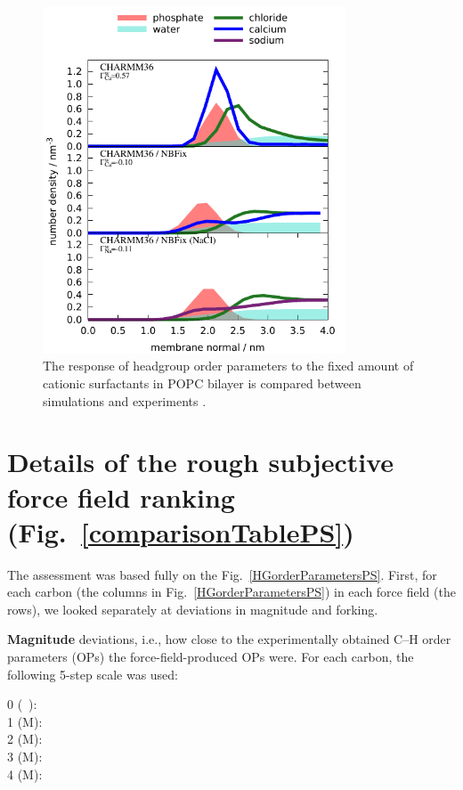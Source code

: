 \documentclass[aps,prl,superscriptaddress,twocolumn]{revtex4}
\begin{document}
\begin{figure}[]
  \centering
  \includegraphics[width=9.0cm]{../Figs/density_profile_CHARMM_CaCl_POPC_NBFix.pdf}
  \caption{\label{density_profile_CHARMM_CaCl_POPC_NBFix}
  The response of headgroup order parameters to the fixed amount of cationic surfactants in
  POPC bilayer is compared between simulations and experiments \cite{scherer89}.}
\end{figure}

\pagebreak
\section{Details of the rough subjective force field ranking (Fig.~\ref{comparisonTablePS})} 

The assessment was based fully on the Fig.~\ref{HGorderParametersPS}.
%
First, for each carbon (the columns in Fig.~\ref{HGorderParametersPS}) in each force field (the rows),
we looked separately at deviations in magnitude and forking.

{\bf Magnitude} deviations, i.e., how close to the experimentally obtained C--H order parameters (OPs)
the force-field-produced OPs were.
%
For each carbon, the following 5-step scale was used:
%
\begin{description}
\item [0 (~):] 
%
\item [1 ({\textsf{\tiny M}}):] 
%
\item [2  ({\textsf{\small M}}):] 
%
\item [3 ({\textsf{\large M}}):] 
%
\item [4 ({\textsf{\Large M}}):] 
\end{description}
\end{document}

